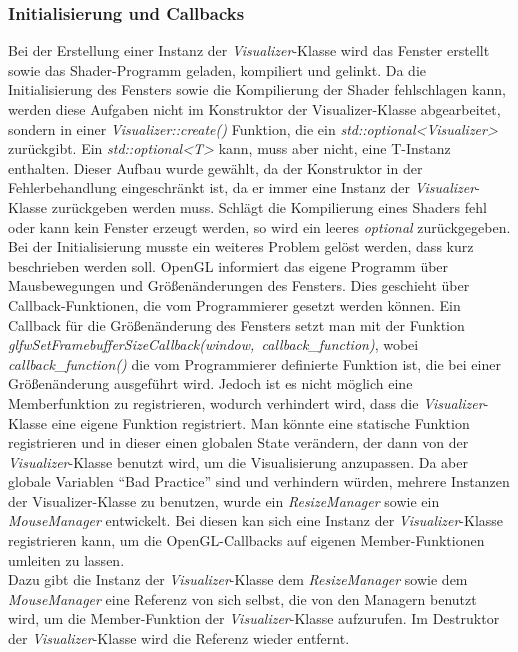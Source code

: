 \documentclass[11pt,a4paper]{article}
\begin{document}
\subsubsection{Initialisierung und Callbacks}
Bei der Erstellung einer Instanz der \mbox{\textit{Visualizer}}-Klasse wird das Fenster erstellt sowie das Shader-Programm geladen, kompiliert und gelinkt. Da die Initialisierung des Fensters sowie die Kompilierung der Shader fehlschlagen kann, werden diese Aufgaben nicht im Konstruktor der Visualizer-Klasse abgearbeitet, sondern in einer \mbox{\textit{Visualizer::create()}} Funktion, die ein \mbox{\textit{std::optional<Visualizer>}} zurückgibt. Ein \mbox{\textit{std::optional<T>}} kann, muss aber nicht, eine T-Instanz enthalten. Dieser Aufbau wurde gewählt, da der Konstruktor in der Fehlerbehandlung eingeschränkt ist, da er immer eine Instanz der \mbox{\textit{Visualizer}}-Klasse zurückgeben werden muss. Schlägt die Kompilierung eines Shaders fehl oder kann kein Fenster erzeugt werden, so wird ein leeres \mbox{\textit{optional}} zurückgegeben.\\
Bei der Initialisierung musste ein weiteres Problem gelöst werden, dass kurz beschrieben werden soll. OpenGL informiert das eigene Programm über Mausbewegungen und Größenänderungen des Fensters. Dies geschieht über Callback-Funktionen, die vom Programmierer gesetzt werden können. Ein Callback für die Größenänderung des Fensters setzt man mit der Funktion \mbox{\textit{glfwSetFramebufferSizeCallback(window, callback\_function)}}, wobei \mbox{\textit{callback\_function()}} die vom Programmierer definierte Funktion ist, die bei einer Größenänderung ausgeführt wird. Jedoch ist es nicht möglich eine Memberfunktion zu registrieren, wodurch verhindert wird, dass die \mbox{\textit{Visualizer}}-Klasse eine eigene Funktion registriert. Man könnte eine statische Funktion registrieren und in dieser einen globalen State verändern, der dann von der \mbox{\textit{Visualizer}}-Klasse benutzt wird, um die Visualisierung anzupassen. Da aber globale Variablen ``Bad Practice'' sind und verhindern würden, mehrere Instanzen der Visualizer-Klasse zu benutzen, wurde ein \mbox{\textit{ResizeManager}} sowie ein \mbox{\textit{MouseManager}} entwickelt. Bei diesen kan sich eine Instanz der \mbox{\textit{Visualizer}}-Klasse registrieren kann, um die OpenGL-Callbacks auf eigenen Member-Funktionen umleiten zu lassen.\\
Dazu gibt die Instanz der \mbox{\textit{Visualizer}}-Klasse dem \mbox{\textit{ResizeManager}} sowie dem \mbox{\textit{MouseManager}} eine Referenz von sich selbst, die von den Managern benutzt wird, um die Member-Funktion der \mbox{\textit{Visualizer}}-Klasse aufzurufen. Im Destruktor der \mbox{\textit{Visualizer}}-Klasse wird die Referenz wieder entfernt.
\end{document}
